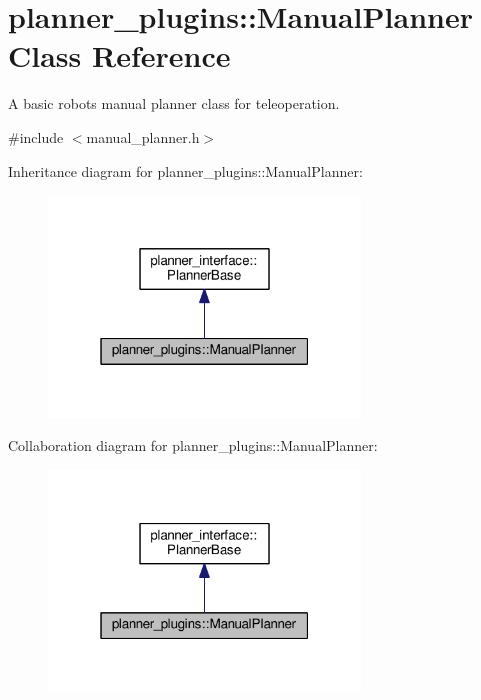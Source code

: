 \hypertarget{classplanner__plugins_1_1ManualPlanner}{}\section{planner\+\_\+plugins\+:\+:Manual\+Planner Class Reference}
\label{classplanner__plugins_1_1ManualPlanner}


A basic robot\textquotesingle{}s manual planner class for teleoperation.  




{\ttfamily \#include $<$manual\+\_\+planner.\+h$>$}



Inheritance diagram for planner\+\_\+plugins\+:\+:Manual\+Planner\+:\nopagebreak
\begin{figure}[H]
\begin{center}
\leavevmode
\includegraphics[width=235pt]{classplanner__plugins_1_1ManualPlanner__inherit__graph}
\end{center}
\end{figure}


Collaboration diagram for planner\+\_\+plugins\+:\+:Manual\+Planner\+:\nopagebreak
\begin{figure}[H]
\begin{center}
\leavevmode
\includegraphics[width=235pt]{classplanner__plugins_1_1ManualPlanner__coll__graph}
\end{center}
\end{figure}
